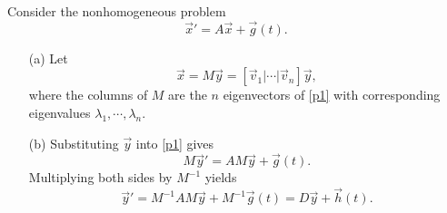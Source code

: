 \documentclass[12pt]{report}
\begin{document}
\begin{solution}

    \noindent
    Consider the nonhomogeneous problem
    \begin{equation}\label{p1}
        \vec{x}' = A\vec{x} + \vec{g}(t).
    \end{equation} 

    \begin{enumerate}
        \item [(a)]
            Let \[\vec{x} = M\vec{y} = [\vec{v}_1 | \cdots | \vec{v}_n]\vec{y},\] where the columns of $M$ are the $n$ eigenvectors of \ref{p1} with corresponding eigenvalues $\lambda_1, \cdots, \lambda_n$.
        
        \item [(b)]
            Substituting $\vec{y}$ into \ref{p1} gives
            \[
                M\vec{y}' = AM\vec{y} + \vec{g}(t).
            \]
            Multiplying both sides by $M^{-1}$ yields
            \[ 
                \vec{y}' = M^{-1}AM\vec{y} + M^{-1}\vec{g}(t) = D\vec{y} + \vec{h}(t).
            \]
        

\end{enumerate}
\end{solution}
\end{document}
